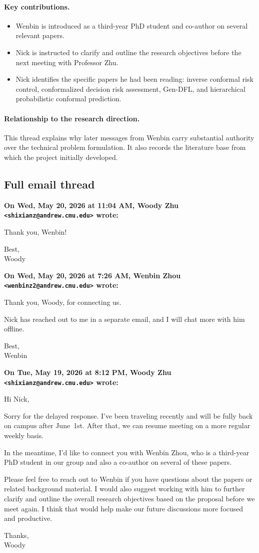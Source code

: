 \documentclass[11pt]{article}
\newcommand{\Email}[3]{%
  \medskip\noindent\textbf{On #1, #2 wrote:}\par\nobreak
  \begingroup\RaggedRight #3\par\endgroup
}
\begin{document}
\paragraph{Key contributions.}
\begin{itemize}[leftmargin=*,itemsep=0.25em]
  \item Wenbin is introduced as a third-year PhD student and co-author on
        several relevant papers.
  \item Nick is instructed to clarify and outline the research objectives
        before the next meeting with Professor Zhu.
  \item Nick identifies the specific papers he had been reading: inverse
        conformal risk control, conformalized decision risk assessment,
        Gen-DFL, and hierarchical probabilistic conformal prediction.
\end{itemize}

\paragraph{Relationship to the research direction.}
This thread explains why later messages from Wenbin carry substantial authority
over the technical problem formulation. It also records the literature base
from which the project initially developed.

\subsection*{Full email thread}
\Email{Wed, May 20, 2026 at 11:04 AM}{Woody Zhu
\texttt{<shixianz@andrew.cmu.edu>}}{%
Thank you, Wenbin!

Best,\\
Woody}

\Email{Wed, May 20, 2026 at 7:26 AM}{Wenbin Zhou
\texttt{<wenbinz2@andrew.cmu.edu>}}{%
Thank you, Woody, for connecting us.

Nick has reached out to me in a separate email, and I will chat more with him
offline.

Best,\\
Wenbin}

\Email{Tue, May 19, 2026 at 8:12 PM}{Woody Zhu
\texttt{<shixianz@andrew.cmu.edu>}}{%
Hi Nick,

Sorry for the delayed response. I've been traveling recently and will be fully
back on campus after June~1st. After that, we can resume meeting on a more
regular weekly basis.

In the meantime, I'd like to connect you with Wenbin Zhou, who is a third-year
PhD student in our group and also a co-author on several of these papers.

Please feel free to reach out to Wenbin if you have questions about the papers
or related background material. I would also suggest working with him to
further clarify and outline the overall research objectives based on the
proposal before we meet again. I think that would help make our future
discussions more focused and productive.

Thanks,\\
Woody}
\end{document}
